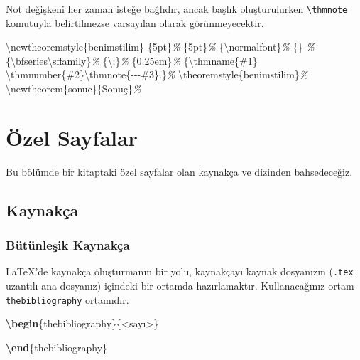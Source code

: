 \documentclass[
  10pt,
]{scrbook}
\newenvironment{Shaded}{}{}
\newcommand{\CommentTok}[1]{\textcolor[rgb]{0.38,0.63,0.69}{\textit{#1}}}
\newcommand{\ExtensionTok}[1]{#1}
\newcommand{\FunctionTok}[1]{\textcolor[rgb]{0.02,0.16,0.49}{#1}}
\newcommand{\KeywordTok}[1]{\textcolor[rgb]{0.00,0.44,0.13}{\textbf{#1}}}
\newcommand{\NormalTok}[1]{#1}
\theoremstyle{definition}
\theoremstyle{definition}
\theoremstyle{definition}
\theoremstyle{definition}
\theoremstyle{remark}
\begin{document}
Not değişkeni her zaman isteğe bağlıdır, ancak başlık oluşturulurken \texttt{\textbackslash{}thmnote} komutuyla belirtilmezse varsayılan olarak görünmeyecektir.

\begin{Shaded}
\begin{Highlighting}[]
\FunctionTok{\textbackslash{}newtheoremstyle}\NormalTok{\{benimstilim\}}
\NormalTok{\{5pt\}}\CommentTok{\% }
\NormalTok{\{5pt\}}\CommentTok{\% }
\NormalTok{\{}\FunctionTok{\textbackslash{}normalfont}\NormalTok{\}}\CommentTok{\% }
\NormalTok{\{\} }\CommentTok{\%}
\NormalTok{\{}\FunctionTok{\textbackslash{}bfseries\textbackslash{}sffamily}\NormalTok{\}}\CommentTok{\%}
\NormalTok{\{}\FunctionTok{\textbackslash{};}\NormalTok{\}}\CommentTok{\% }
\NormalTok{\{0.25em\}}\CommentTok{\% }
\NormalTok{\{}\FunctionTok{\textbackslash{}thmname}\NormalTok{\{\#1\} }\FunctionTok{\textbackslash{}thmnumber}\NormalTok{\{\#2\}}\FunctionTok{\textbackslash{}thmnote}\NormalTok{\{{-}{-}{-}\#3\}.\}}\CommentTok{\%}
\FunctionTok{\textbackslash{}theoremstyle}\NormalTok{\{benimstilim\}}\CommentTok{\%}
\FunctionTok{\textbackslash{}newtheorem}\NormalTok{\{sonuc\}\{Sonuç\}}\CommentTok{\%}
\end{Highlighting}
\end{Shaded}

\hypertarget{uxf6zel-sayfalar}{%
\chapter{Özel Sayfalar}\label{uxf6zel-sayfalar}}

Bu bölümde bir kitaptaki özel sayfalar olan kaynakça ve dizinden bahsedeceğiz.

\hypertarget{kaynakuxe7a}{%
\section{Kaynakça}\label{kaynakuxe7a}}

\hypertarget{buxfctuxfcnleux15fik-kaynakuxe7a}{%
\subsection{Bütünleşik Kaynakça}\label{buxfctuxfcnleux15fik-kaynakuxe7a}}

LaTeX'de kaynakça oluşturmanın bir yolu, kaynakçayı kaynak dosyanızın (\texttt{.tex} uzantılı ana dosyanız) içindeki bir ortamda hazırlamaktır. Kullanacağınız ortam \texttt{thebibliography} ortamıdır.

\begin{Shaded}
\begin{Highlighting}[]
\KeywordTok{\textbackslash{}begin}\NormalTok{\{}\ExtensionTok{thebibliography}\NormalTok{\}\{\textless{}sayı\textgreater{}\}}

\KeywordTok{\textbackslash{}end}\NormalTok{\{}\ExtensionTok{thebibliography}\NormalTok{\}}
\end{Highlighting}
\end{Shaded}
\end{document}
